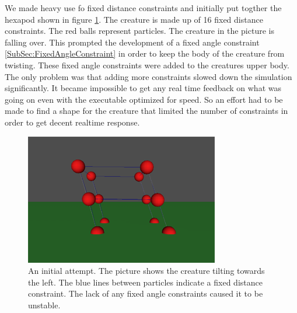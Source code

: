 We made heavy use fo fixed distance constraints and initially put togther the
hexapod shown in figure \ref{Fig:NoFixedAngle}. The creature is made up of 16
fixed distance constraints. The red balls represent particles. The creature in
the picture is falling over. This prompted the development of a fixed angle
constraint \ref{SubSec:FixedAngleConstraint} in order to keep the body of the
creature from twisting. These fixed angle constraints were added to the
creatures upper body.  The only problem was that adding more constraints slowed
down the simulation significantly. It became impossible to get any real time
feedback on what was going on even with the executable optimized
for speed.  So an effort had to be made to find a shape for the creature that
limited the number of constraints in order to get decent realtime response.
\begin{figure}
    \centering
    \includegraphics[height=0.25\textheight]{NoFixedAngle}
    \caption{\label{Fig:NoFixedAngle}An initial attempt. The picture shows the
    creature tilting towards the left. The blue lines between particles indicate
    a fixed distance constraint. The lack of any fixed angle constraints caused
    it to be unstable.}
\end{figure}


